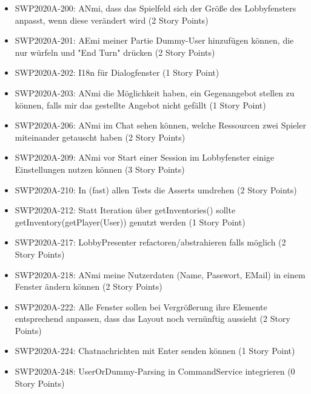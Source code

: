 \documentclass[12pt,a4paper, oneside]{article}
\begin{document}
\begin{itemize}
        \item SWP2020A-200: ANmi, dass das Spielfeld sich der Größe des Lobbyfensters anpasst, wenn diese verändert wird (2 Story Points)

        \item SWP2020A-201: AEmi meiner Partie Dummy-User hinzufügen können, die nur würfeln und "End Turn" drücken (2 Story Points)

        \item SWP2020A-202: I18n für Dialogfenster (1 Story Point)

        \item SWP2020A-203: ANmi die Möglichkeit haben, ein Gegenangebot stellen zu können, falls mir das gestellte Angebot nicht gefällt (1 Story Point)

        \item SWP2020A-206: ANmi im Chat sehen können, welche Ressourcen zwei Spieler miteinander getauscht haben (2 Story Points)

        \item SWP2020A-209: ANmi vor Start einer Session im Lobbyfenster einige Einstellungen nutzen können (3 Story Points)

        \item SWP2020A-210: In (fast) allen Tests die Asserts umdrehen (2 Story Points)

        \item SWP2020A-212: Statt Iteration über getInventories() sollte getInventory(getPlayer(User)) genutzt werden (1 Story Point)

        \item SWP2020A-217: LobbyPresenter refactoren/abstrahieren falls möglich (2 Story Points)

        \item SWP2020A-218: ANmi meine Nutzerdaten (Name, Passwort, EMail) in einem Fenster ändern können (2 Story Points)

        \item SWP2020A-222: Alle Fenster sollen bei Vergrößerung ihre Elemente entsprechend anpassen, dass das Layout noch vernünftig aussieht (2 Story Points)

        \item SWP2020A-224: Chatnachrichten mit Enter senden können (1 Story Point)

        \item SWP2020A-248: UserOrDummy-Parsing in CommandService integrieren (0 Story Points)

    \end{itemize}
\end{document}
